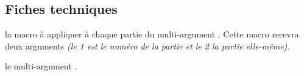 \documentclass[12pt,a4paper]{article}
\begin{document}
\begin{latexex-alone}
\newcommand\decofirstandothers[2]{%
    \ifnum#1=1
        \fbox{#2} %
    \else%
        <<#2>> %
    \fi%
}

\newcommand\multiapplyafterone[1]{%
    \tns@multi@apply@each{\decofirstandothers}{#1}
}
\end{latexex-alone}




\subsection{Fiches techniques}


 la macro à appliquer à chaque partie du \og multi-argument \fg.
          Cette macro recevra deux arguments \emph{(le 1\ier{} est le numéro de la partie et le 2\ieme{} la partie elle-même)}.

 le \og multi-argument \fg.
\end{document}
